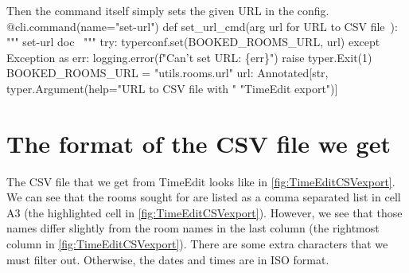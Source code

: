 Then the command itself simply sets the given URL in the config.
\nwenddocs{}\endmoddef\nwstartdeflinemarkup{}\nwenddeflinemarkup
@cli.command(name="set-url")
def set_url_cmd(\LA{}arg \code{}url\edoc{} for URL to CSV file~{\nwtagstyle{}}\RA{}):
  """
  \LA{}\code{}set-url\edoc{} doc~{\nwtagstyle{}}\RA{}
  """
  try:
    typerconf.set(BOOKED_ROOMS_URL, url)
  except Exception as err:
    logging.error(f"Can't set URL: \{err\}")
    raise typer.Exit(1)
\nwendcode{}\endmoddef\nwstartdeflinemarkup{}\nwenddeflinemarkup
BOOKED_ROOMS_URL = "utils.rooms.url"
\nwendcode{}\endmoddef\nwstartdeflinemarkup{}\nwenddeflinemarkup
url: Annotated[str, typer.Argument(help="URL to CSV file with "
                                        "TimeEdit export")]
\nwendcode{}\nwdocspar


\section{The format of the CSV file we get}

The CSV file that we get from TimeEdit looks like in 
\cref{fig:TimeEditCSVexport}.
We can see that the rooms sought for are listed as a comma separated list in 
cell A3 (the highlighted cell in \cref{fig:TimeEditCSVexport}).
However, we see that those names differ slightly from the room names in the 
last column (the rightmost column in \cref{fig:TimeEditCSVexport}).
There are some extra characters that we must filter out.
Otherwise, the dates and times are in ISO format.

